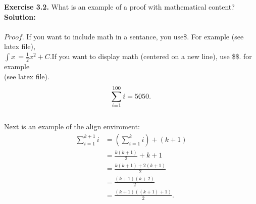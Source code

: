 \documentclass{article}
\begin{document}
	\textbf{Exercise 3.2.} What is an example of a proof with mathematical content?\\
	\textbf{Solution:}\\
	\\
	$Proof.$ If you want to include math in a sentance, you use\$. For example (see latex file),\\
	$\int x \, = \frac{1}{2} x^2 + C$.If you want to display math (centered on a new line), use \$\$. for example\\
	(see latex file).
	\begin{equation}
		\sum_{i = 1}^{100} i = 5050. \notag
	\end{equation}
	\\
	Next is an example of the align enviroment:\\
	
	\begin{align*}
		\sum_{i = 1}^{k + 1} i &= (\sum_{i = 1}^{k} i) + (k + 1)\\
							   &= \frac{k(k + 1)}{2} + k + 1 \\
							   &= \frac{k(k + 1) + 2(k + 1)}{2} \\
							   &= \frac{(k + 1)(k + 2)}{2} \\
							   &= \frac{(k + 1)((k + 1) + 1)}{2}. \\
	\end{align*}
	
\end{document}
